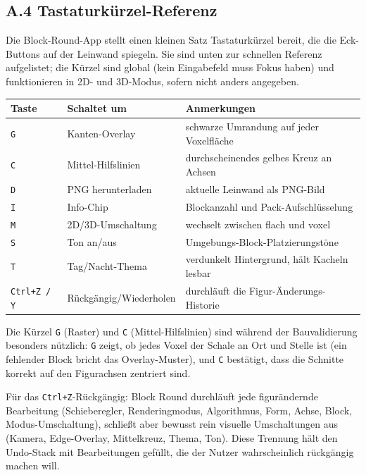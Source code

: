 \documentclass[12pt,a4paper]{scrartcl}
\newcommand{\code}[1]{\texttt{\small #1}}
\begin{document}
\subsection*{A.4 Tastaturkürzel-Referenz}

Die Block-Round-App stellt einen kleinen Satz Tastaturkürzel bereit, die die Eck-Buttons auf der Leinwand spiegeln. Sie sind unten zur schnellen Referenz aufgelistet; die Kürzel sind global (kein Eingabefeld muss Fokus haben) und funktionieren in 2D- und 3D-Modus, sofern nicht anders angegeben.

\vspace{0.4em}
\begin{center}
\begin{tabular}{@{}lll@{}}
\toprule
\textbf{Taste} & \textbf{Schaltet um} & \textbf{Anmerkungen} \\
\midrule
\code{G} & Kanten-Overlay  & schwarze Umrandung auf jeder Voxelfläche \\
\code{C} & Mittel-Hilfslinien  & durchscheinendes gelbes Kreuz an Achsen \\
\code{D} & PNG herunterladen  & aktuelle Leinwand als PNG-Bild \\
\code{I} & Info-Chip  & Blockanzahl und Pack-Aufschlüsselung \\
\code{M} & 2D/3D-Umschaltung  & wechselt zwischen flach und voxel \\
\code{S} & Ton an/aus  & Umgebungs-Block-Platzierungstöne \\
\code{T} & Tag/Nacht-Thema  & verdunkelt Hintergrund, hält Kacheln lesbar \\
\code{Ctrl+Z / Y} & Rückgängig/Wiederholen  & durchläuft die Figur-Änderungs-Historie \\
\bottomrule
\end{tabular}
\end{center}

Die Kürzel \code{G} (Raster) und \code{C} (Mittel-Hilfslinien) sind während der Bauvalidierung besonders nützlich: \code{G} zeigt, ob jedes Voxel der Schale an Ort und Stelle ist (ein fehlender Block bricht das Overlay-Muster), und \code{C} bestätigt, dass die Schnitte korrekt auf den Figurachsen zentriert sind.

Für das \code{Ctrl+Z}-Rückgängig: Block Round durchläuft jede figurändernde Bearbeitung (Schieberegler, Renderingmodus, Algorithmus, Form, Achse, Block, Modus-Umschaltung), schließt aber bewusst rein visuelle Umschaltungen aus (Kamera, Edge-Overlay, Mittelkreuz, Thema, Ton). Diese Trennung hält den Undo-Stack mit Bearbeitungen gefüllt, die der Nutzer wahrscheinlich rückgängig machen will.
\end{document}
